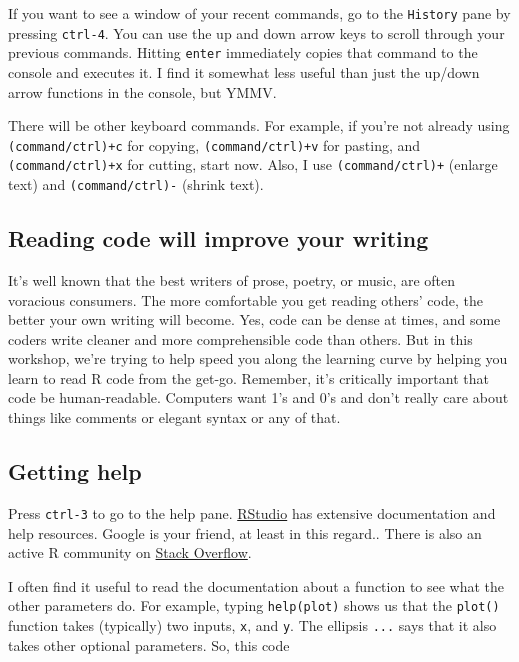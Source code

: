 \documentclass[]{article}
\begin{document}
If you want to see a window of your recent commands, go to the
\texttt{History} pane by pressing \texttt{ctrl-4}. You can use the up
and down arrow keys to scroll through your previous commands. Hitting
\texttt{enter} immediately copies that command to the console and
executes it. I find it somewhat less useful than just the up/down arrow
functions in the console, but YMMV.

There will be other keyboard commands. For example, if you're not
already using \texttt{(command/ctrl)+c} for copying,
\texttt{(command/ctrl)+v} for pasting, and \texttt{(command/ctrl)+x} for
cutting, start now. Also, I use \texttt{(command/ctrl)+} (enlarge text)
and \texttt{(command/ctrl)-} (shrink text).

\subsection{Reading code will improve your
writing}\label{reading-code-will-improve-your-writing}

It's well known that the best writers of prose, poetry, or music, are
often voracious consumers. The more comfortable you get reading others'
code, the better your own writing will become. Yes, code can be dense at
times, and some coders write cleaner and more comprehensible code than
others. But in this workshop, we're trying to help speed you along the
learning curve by helping you learn to read R code from the get-go.
Remember, it's critically important that code be human-readable.
Computers want 1's and 0's and don't really care about things like
comments or elegant syntax or any of that.

\subsection{Getting help}\label{getting-help}

Press \texttt{ctrl-3} to go to the help pane.
\href{http://rstudio.com}{RStudio} has extensive documentation and help
resources. Google is your friend, at least in this regard.. There is
also an active R community on \href{http://stackoverflow.com}{Stack
Overflow}.

I often find it useful to read the documentation about a function to see
what the other parameters do. For example, typing
\texttt{help(\textquotesingle{}plot\textquotesingle{})} shows us that
the \texttt{plot()} function takes (typically) two inputs, \texttt{x},
and \texttt{y}. The ellipsis \texttt{...} says that it also takes other
optional parameters. So, this code
\end{document}
